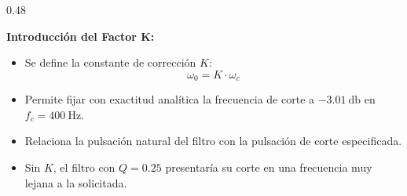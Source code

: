 \documentclass[aspectratio=169, 10pt]{beamer}
\begin{document}
\begin{frame}
\begin{columns}[t, onlytextwidth]
    \begin{column}{0.48\textwidth}
      \begin{tarjeta}[colframe=BlueAccent]
        {\fontsize{9pt}{11pt}\selectfont \textbf{\color{BlueAccent} Introducción del Factor K:}}\\[2pt]
        {\fontsize{8pt}{10pt}\selectfont
        \begin{itemize}\setlength{\itemsep}{2.5pt}
          \item Se define la constante de corrección $K$:
          \[ \omega_0 = K \cdot \omega_c \]
          \item Permite fijar con exactitud analítica la frecuencia de corte a $\qty{-3.01}{\decibel}$ en $f_c = \qty{400}{\hertz}$.
          \item Relaciona la pulsación natural del filtro con la pulsación de corte especificada.
          \item Sin $K$, el filtro con $Q=0.25$ presentaría su corte en una frecuencia muy lejana a la solicitada.
        \end{itemize}
        }
      \end{tarjeta}
    \end{column}
  \end{columns}
\end{frame}

\end{document}
